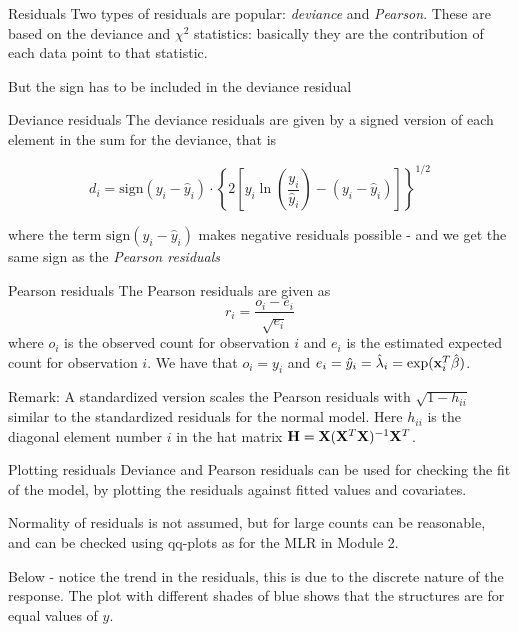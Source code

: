 \documentclass[
  ignorenonframetext,
]{beamer}
\begin{document}
\begin{frame}{Residuals}
\protect\hypertarget{residuals}{}
Two types of residuals are popular: \emph{deviance} and \emph{Pearson}.
These are based on the deviance and \(\chi^2\) statistics: basically
they are the contribution of each data point to that statistic.

But the sign has to be included in the deviance residual
\end{frame}

\begin{frame}
\begin{block}{Deviance residuals}
\protect\hypertarget{deviance-residuals}{}
The deviance residuals are given by a signed version of each element in
the sum for the deviance, that is

\[
d_i=\text{sign}(y_i-\hat{y}_i)\cdot \left\{ 
2[y_i\ln(\frac{y_i}{\hat{y}_i})-(y_i-\hat{y}_i)]\right\}^{1/2}
\]

where the term \(\text{sign}(y_i-\hat{y}_i)\) makes negative residuals
possible - and we get the same sign as the \emph{Pearson residuals}
\end{block}
\end{frame}

\begin{frame}
\begin{block}{Pearson residuals}
\protect\hypertarget{pearson-residuals}{}
The Pearson residuals are given as \[ r_i=\frac{o_i-e_i}{\sqrt{e_i}}\]
where \(o_i\) is the observed count for observation \(i\) and \(e_i\) is
the estimated expected count for observation \(i\). We have that
\(o_i=y_i\) and
\(e_i=\hat{y}_i=\hat{\lambda}_i=\exp({\bf x}_i^T\hat{\beta})\).

Remark: A standardized version scales the Pearson residuals with
\(\sqrt{1-h_{ii}}\) similar to the standardized residuals for the normal
model. Here \(h_{ii}\) is the diagonal element number \(i\) in the hat
matrix \({\bf H}={\bf X}({\bf X}^T{\bf X})^{-1}{\bf X}^T\).
\end{block}
\end{frame}

\begin{frame}
\begin{block}{Plotting residuals}
\protect\hypertarget{plotting-residuals}{}
Deviance and Pearson residuals can be used for checking the fit of the
model, by plotting the residuals against fitted values and covariates.

Normality of residuals is not assumed, but for large counts can be
reasonable, and can be checked using qq-plots as for the MLR in Module
2.

Below - notice the trend in the residuals, this is due to the discrete
nature of the response. The plot with different shades of blue shows
that the structures are for equal values of \(y\).
\end{block}
\end{frame}
\end{document}

